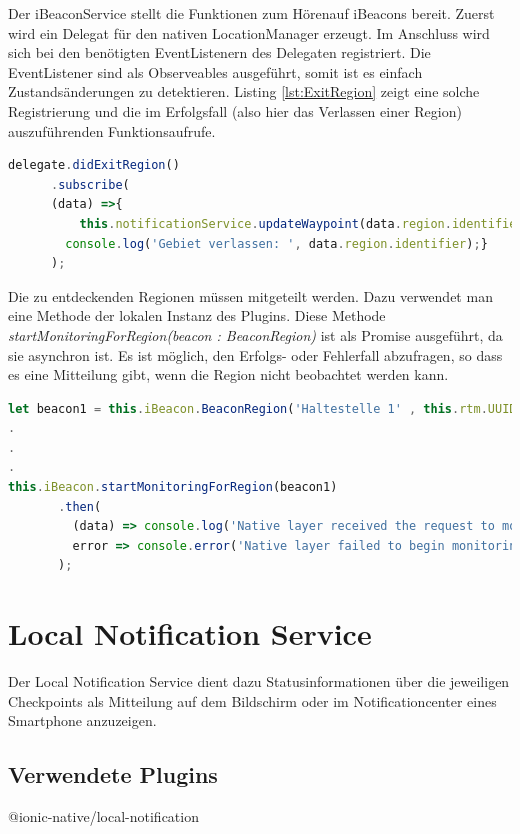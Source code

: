 Der iBeaconService stellt die Funktionen zum \glqq Hören\grqq auf iBeacons bereit. Zuerst wird ein Delegat \cite{Schatten2010} für den nativen LocationManager erzeugt. Im Anschluss wird sich bei den benötigten EventListenern des Delegaten registriert. Die EventListener sind als Observeables ausgeführt, somit ist es einfach Zustandsänderungen zu detektieren. Listing \ref{lst:ExitRegion} zeigt eine solche Registrierung und die im Erfolgsfall (also hier das Verlassen einer Region) auszuführenden Funktionsaufrufe.

\begin{lstlisting}[float, language=JavaScript, caption= Registrieren beim didExitRegion-EventListener  , label=lst:ExitRegion]
delegate.didExitRegion()
      .subscribe(
      (data) =>{
          this.notificationService.updateWaypoint(data.region.identifier);
        console.log('Gebiet verlassen: ', data.region.identifier);}      
      );
\end{lstlisting}

Die zu entdeckenden Regionen müssen mitgeteilt werden. Dazu verwendet man eine Methode der lokalen Instanz des Plugins. Diese Methode \textit{startMonitoringForRegion(beacon : BeaconRegion)} ist als Promise ausgeführt, da sie asynchron ist. Es ist möglich, den Erfolgs- oder Fehlerfall abzufragen, so dass es eine Mitteilung gibt, wenn die Region nicht beobachtet werden kann. 

\begin{lstlisting}[float, language=JavaScript, caption= Übergabe einer Region an das iBeacon Objekt.  , label=lst:RegisterRegion]
let beacon1 = this.iBeacon.BeaconRegion('Haltestelle 1' , this.rtm.UUID, 10001, 10002);
.
.
.
this.iBeacon.startMonitoringForRegion(beacon1)
       .then(
         (data) => console.log('Native layer received the request to monitoring' + JSON.stringify(data)),
         error => console.error('Native layer failed to begin monitoring: ', JSON.stringify(error))
       );
\end{lstlisting}

  
\section{Local Notification Service}
\label{srv:LNotificationService}
Der Local Notification Service dient dazu Statusinformationen über die jeweiligen Checkpoints als Mitteilung auf dem Bildschirm oder im Notificationcenter eines Smartphone anzuzeigen.
\subsection{Verwendete Plugins}
@ionic-native/local-notification \cite{LocalNotificationPluginDoku}
